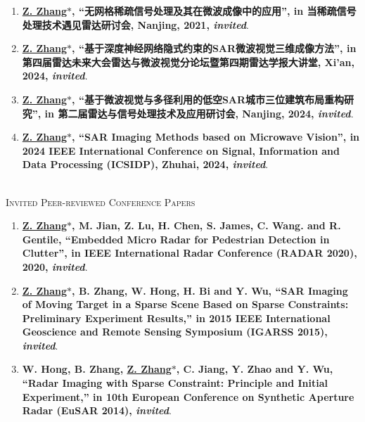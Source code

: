 \documentclass[paper=a4,fontsize=11pt]{scrartcl}
\begin{document}
\begin{enumerate}

\item \textbf{\underline{Z. Zhang$\ast$}, ``无网格稀疏信号处理及其在微波成像中的应用'', in 当稀疏信号处理技术遇见雷达研讨会, Nanjing, 2021, \emph{invited}}.

\item \textbf{\underline{Z. Zhang$\ast$}, ``基于深度神经网络隐式约束的SAR微波视觉三维成像方法'', in 第四届雷达未来大会雷达与微波视觉分论坛暨第四期雷达学报大讲堂, Xi'an, 2024, \emph{invited}}.

\item \textbf{\underline{Z. Zhang$\ast$}, ``基于微波视觉与多径利用的低空SAR城市三位建筑布局重构研究'', in 第二届雷达与信号处理技术及应用研讨会, Nanjing, 2024, \emph{invited}}.

\item \textbf{\underline{Z. Zhang$\ast$}, ``SAR Imaging Methods based on Microwave Vision'', in 2024 IEEE International Conference on Signal, Information and Data Processing (ICSIDP), Zhuhai, 2024, \emph{invited}}.

\end{enumerate}

~\\

\textsc{Invited Peer-reviewed Conference Papers}

\begin{enumerate}
	
\item \textbf{\underline{Z. Zhang$\ast$}, M. Jian, Z. Lu, H. Chen, S. James, C. Wang. and R. Gentile, ``Embedded Micro Radar for Pedestrian Detection in Clutter'', in IEEE International Radar Conference (RADAR 2020), 2020, \emph{invited}}.
   
\item \textbf{\underline{Z. Zhang$\ast$}, B. Zhang, W. Hong, H. Bi and Y. Wu, ``SAR Imaging of Moving Target in a Sparse Scene Based on Sparse Constraints: Preliminary Experiment Results,'' in 2015 IEEE International Geoscience and Remote Sensing Symposium (IGARSS 2015), \emph{invited}}.

\item \textbf{W. Hong, B. Zhang, \underline{Z. Zhang$\ast$}, C. Jiang, Y. Zhao and Y. Wu, ``Radar Imaging with Sparse Constraint: Principle and Initial Experiment,'' in 10th European Conference on Synthetic Aperture Radar (EuSAR 2014), \emph{invited}}.


\end{enumerate}
\end{document}

